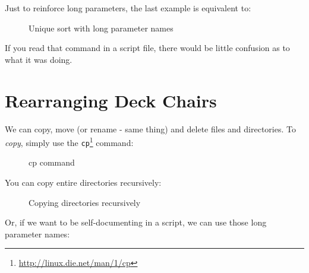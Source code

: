 \documentclass[10pt,american,]{book}
\makeatletter
\newenvironment{Shaded}{\begin{snugshade}}{\end{snugshade}}
\newcommand{\KeywordTok}[1]{\textcolor[rgb]{0.13,0.29,0.53}{\textbf{{#1}}}}
\newcommand{\NormalTok}[1]{{#1}}
\renewcommand{\href}[2]{#2\footnote{\url{#1}}}
\numberwithin{figure}{chapter}
\DeclareRobustCommand{\drcap}[1]{\begin{figure}[H]\caption{#1}\end{figure}}
\DeclareRobustCommand{\drcmd}[1]{\index{Commands!#1@\texttt{#1}}}
\renewcommand{\KeywordTok}[1]{{#1}}
\renewcommand{\NormalTok}[1]{{#1}}
\makeatother
\begin{document}
Just to reinforce long parameters, the last example is equivalent to:

\drcap{Unique sort with long parameter names}

\begin{Shaded}
\end{Shaded}

If you read that command in a script file, there would be little
confusion as to what it was doing.

\section*{Rearranging Deck Chairs}\label{rearranging-deck-chairs}

We can copy, move (or rename - same thing) and delete files and
directories. To \emph{copy}, simply use the
\href{http://linux.die.net/man/1/cp}{\texttt{cp}}\drcmd{cp} command:

\drcap{cp command}

\begin{Shaded}
\end{Shaded}

You can copy entire directories recursively:

\drcap{Copying directories recursively}

\begin{Shaded}
\end{Shaded}

Or, if we want to be self-documenting in a script, we can use those long
parameter names:
\end{document}
